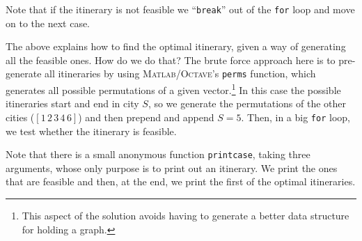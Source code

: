 \documentclass[11pt]{amsart}
\newcommand{\mfile}[2]{\bigskip
\begin{quote}
\VerbatimInput[frame=single,framesep=3mm,label=\fbox{\normalsize \textsl{\,#2\,}},fontfamily=courier,fontsize=\scriptsize]{#1}
\end{quote}
}
\newcommand{\Matlab}{\textsc{Matlab}\xspace}
\newcommand{\Octave}{\textsc{Octave}\xspace}
\begin{document}
\medskip
\noindent Note that if the itinerary is not feasible we ``\texttt{break}'' out of the \texttt{for} loop and move on to the next case.

The above explains how to find the optimal itinerary, given a way of generating all the feasible ones.  How do we do that?  The brute force approach here is to pre-generate all itineraries by using \Matlab/\Octave's \texttt{perms} function, which generates all possible permutations of a given vector.\footnote{This aspect of the solution avoids having to generate a better data structure for holding a graph.}  In this case the possible itineraries start and end in city $S$, so we generate the permutations of the other cities ($[1\,2\,3\,4\,6]$) and then prepend and append $S=5$.  Then, in a big \texttt{for} loop, we test whether the itinerary is feasible.

Note that there is a small anonymous function \texttt{printcase}, taking three arguments, whose only purpose is to print out an itinerary.  We print the ones that are feasible and then, at the end, we print the first of the optimal itineraries.

\bigskip

\mfile{matlab/tsp.m}{tsp.m}
\end{document}
